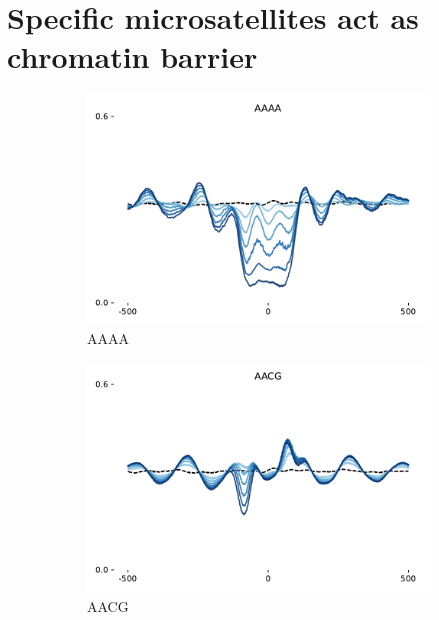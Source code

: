 \documentclass[11pt]{book}
\begin{document}
\FloatBarrier
\clearpage
\section{Specific microsatellites act as chromatin barrier}
\begin{figure}[htbp]
    \centering
    \begin{subfigure}[t]{0.32\textwidth}
        \includegraphics[width=\linewidth]{Figures/synthetic_genomics_simple/AAAA.pdf}
        \caption{AAAA}
        \label{fig:aaaa}
    \end{subfigure}
    \hfill
    \begin{subfigure}[t]{0.32\textwidth}
    \includegraphics[width=\linewidth]{Figures/synthetic_genomics_simple/AACG.pdf}
        \caption{AACG}
        \label{fig:aacg}
    \end{subfigure}
    \hfill
    \begin{subfigure}[t]{0.32\textwidth}

\end{subfigure}
\end{figure}
\end{document}
